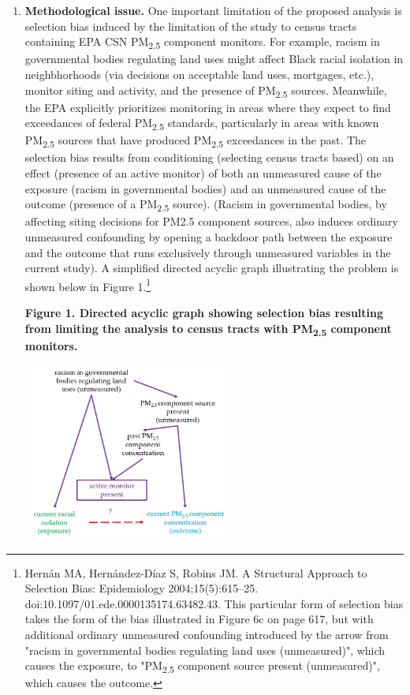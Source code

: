 \documentclass{article}\usepackage[]{graphicx}\usepackage[]{color}
\begin{document}
\begin{enumerate}[label=\textbf{\arabic*.}]
\begin{enumerate}[label=\textbf{\alph*.}]
    \end{enumerate}
  
  \item \textbf{Methodological issue.} One important limitation of the proposed analysis is selection bias induced by the limitation of the study to census tracts containing EPA CSN PM\textsubscript{2.5} component monitors. For example, racism in governmental bodies regulating land uses might affect Black racial isolation in neighbhorhoods (via decisions on acceptable land uses, mortgages, etc.), monitor siting and activity, and the presence of PM\textsubscript{2.5} sources. Meanwhile, the EPA explicitly prioritizes monitoring in areas where they expect to find exceedances of federal PM\textsubscript{2.5} standards, particularly in areas with known PM\textsubscript{2.5} sources that have produced PM\textsubscript{2.5} exceedances in the past. The selection bias results from conditioning (selecting census tracts based) on an effect (presence of an active monitor) of both an unmeasured cause of the exposure (racism in governmental bodies) and an unmeasured cause of the outcome (presence of a PM\textsubscript{2.5} source). (Racism in governmental bodies, by affecting siting decisions for PM2.5 component sources, also induces ordinary unmeasured confounding by opening a backdoor path between the exposure and the outcome that runs exclusively through unmeasured variables in the current study). A simplified directed acyclic graph illustrating the problem is shown below in Figure 1.\footnote{Hernán MA, Hernández-Díaz S, Robins JM. A Structural Approach to Selection Bias: Epidemiology 2004;15(5):615–25. doi:10.1097/01.ede.0000135174.63482.43. This particular form of selection bias takes the form of the bias illustrated in Figure 6c on page 617, but with additional ordinary unmeasured confounding introduced by the arrow from "racism in governmental bodies regulating land uses (unmeasured)", which causes the exposure, to "PM\textsubscript{2.5} component source present (unmeasured)", which causes the outcome.}
  
  \textbf{Figure 1. Directed acyclic graph showing selection bias resulting from limiting the analysis to census tracts with PM\textsubscript{2.5} component monitors.}
  
  \includegraphics[height=2.3in]{midtermdag.JPG}


\end{enumerate}
\end{document}
